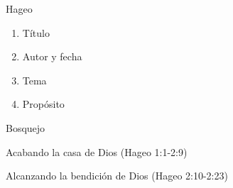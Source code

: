\documentclass[12pt]{article}
\begin{document}
\begin{section}{Hageo}
	\begin{enumerate}
		\item Título\\
		\item Autor y fecha\\
		\item Tema\\
		\item Propósito\\
	\end{enumerate}
	\begin{subsection}{Bosquejo}
		\begin{subsubsection}{Acabando la casa de Dios (Hageo 1:1-2:9)}
		\end{subsubsection}
		\begin{subsubsection}{Alcanzando la bendición de Dios (Hageo 2:10-2:23)}
		\end{subsubsection}
	\end{subsection}
\end{section}
\end{document}
